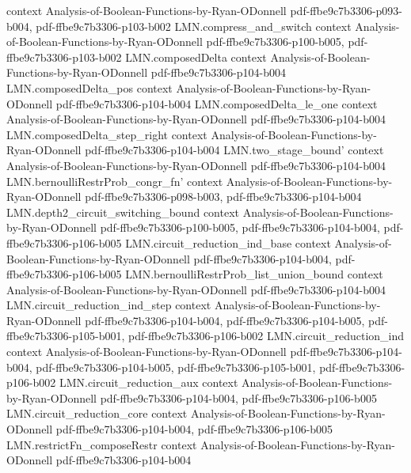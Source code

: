 \begin{lemma}
  {context}
  {Analysis-of-Boolean-Functions-by-Ryan-ODonnell}
  {pdf-ffbe9c7b3306-p093-b004,
    pdf-ffbe9c7b3306-p103-b002}
\proofstep
  {LMN.compress_and_switch}
  {context}
  {Analysis-of-Boolean-Functions-by-Ryan-ODonnell}
  {pdf-ffbe9c7b3306-p100-b005,
    pdf-ffbe9c7b3306-p103-b002}
\proofstep
  {LMN.composedDelta}
  {context}
  {Analysis-of-Boolean-Functions-by-Ryan-ODonnell}
  {pdf-ffbe9c7b3306-p104-b004}
\proofstep
  {LMN.composedDelta_pos}
  {context}
  {Analysis-of-Boolean-Functions-by-Ryan-ODonnell}
  {pdf-ffbe9c7b3306-p104-b004}
\proofstep
  {LMN.composedDelta_le_one}
  {context}
  {Analysis-of-Boolean-Functions-by-Ryan-ODonnell}
  {pdf-ffbe9c7b3306-p104-b004}
\proofstep
  {LMN.composedDelta_step_right}
  {context}
  {Analysis-of-Boolean-Functions-by-Ryan-ODonnell}
  {pdf-ffbe9c7b3306-p104-b004}
\proofstep
  {LMN.two_stage_bound'}
  {context}
  {Analysis-of-Boolean-Functions-by-Ryan-ODonnell}
  {pdf-ffbe9c7b3306-p104-b004}
\proofstep
  {LMN.bernoulliRestrProb_congr_fn'}
  {context}
  {Analysis-of-Boolean-Functions-by-Ryan-ODonnell}
  {pdf-ffbe9c7b3306-p098-b003,
    pdf-ffbe9c7b3306-p104-b004}
\proofstep
  {LMN.depth2_circuit_switching_bound}
  {context}
  {Analysis-of-Boolean-Functions-by-Ryan-ODonnell}
  {pdf-ffbe9c7b3306-p100-b005,
    pdf-ffbe9c7b3306-p104-b004,
    pdf-ffbe9c7b3306-p106-b005}
\proofstep
  {LMN.circuit_reduction_ind_base}
  {context}
  {Analysis-of-Boolean-Functions-by-Ryan-ODonnell}
  {pdf-ffbe9c7b3306-p104-b004,
    pdf-ffbe9c7b3306-p106-b005}
\proofstep
  {LMN.bernoulliRestrProb_list_union_bound}
  {context}
  {Analysis-of-Boolean-Functions-by-Ryan-ODonnell}
  {pdf-ffbe9c7b3306-p104-b004}
\proofstep
  {LMN.circuit_reduction_ind_step}
  {context}
  {Analysis-of-Boolean-Functions-by-Ryan-ODonnell}
  {pdf-ffbe9c7b3306-p104-b004,
    pdf-ffbe9c7b3306-p104-b005,
    pdf-ffbe9c7b3306-p105-b001,
    pdf-ffbe9c7b3306-p106-b002}
\proofstep
  {LMN.circuit_reduction_ind}
  {context}
  {Analysis-of-Boolean-Functions-by-Ryan-ODonnell}
  {pdf-ffbe9c7b3306-p104-b004,
    pdf-ffbe9c7b3306-p104-b005,
    pdf-ffbe9c7b3306-p105-b001,
    pdf-ffbe9c7b3306-p106-b002}
\proofstep
  {LMN.circuit_reduction_aux}
  {context}
  {Analysis-of-Boolean-Functions-by-Ryan-ODonnell}
  {pdf-ffbe9c7b3306-p104-b004,
    pdf-ffbe9c7b3306-p106-b005}
\proofstep
  {LMN.circuit_reduction_core}
  {context}
  {Analysis-of-Boolean-Functions-by-Ryan-ODonnell}
  {pdf-ffbe9c7b3306-p104-b004,
    pdf-ffbe9c7b3306-p106-b005}
\proofstep
  {LMN.restrictFn_composeRestr}
  {context}
  {Analysis-of-Boolean-Functions-by-Ryan-ODonnell}
  {pdf-ffbe9c7b3306-p104-b004}
\proofstep

\end{lemma}
